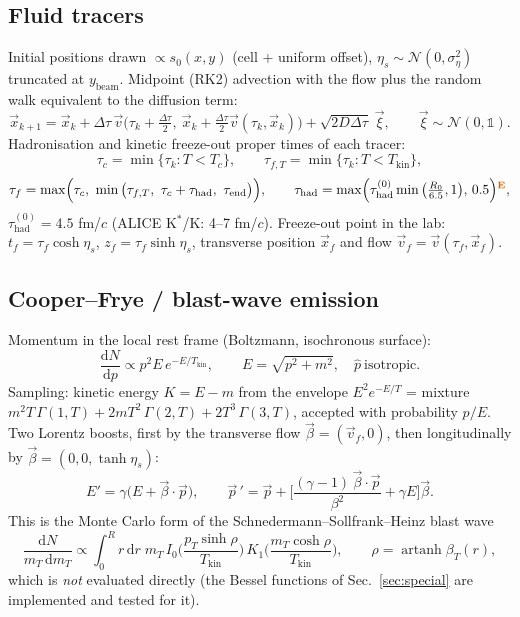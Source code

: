 \documentclass[11pt,a4paper]{article}
\newcommand{\emp}{\textsuperscript{\color{orange!80!black}\textbf{E}}}
\begin{document}
\subsection{Fluid tracers}
Initial positions drawn $\propto s_0(x,y)$ (cell + uniform offset), $\eta_s\sim\mathcal N(0,\sigma_\eta^2)$ truncated at
$y_\text{beam}$. Midpoint (RK2) advection with the flow plus the random walk equivalent to the diffusion term:
\begin{equation}
\vec x_{k+1} = \vec x_k + \Delta\tau\,\vec v\big(\tau_k+\tfrac{\Delta\tau}2,\ \vec x_k+\tfrac{\Delta\tau}2\vec v(\tau_k,\vec x_k)\big)
+ \sqrt{2D\Delta\tau}\;\vec\xi,\qquad \vec\xi\sim\mathcal N(0,\mathbb 1).
\end{equation}
Hadronisation and kinetic freeze-out proper times of each tracer:
\begin{equation}
\tau_c = \min\{\tau_k: T<T_c\},\qquad \tau_{f,T} = \min\{\tau_k: T<T_\text{kin}\},
\end{equation}
\begin{equation}
\tau_f = \max\!\Big(\tau_c,\ \min\big(\tau_{f,T},\ \tau_c+\tau_\text{had},\ \tau_\text{end}\big)\Big),\qquad
\tau_\text{had} = \max\!\Big(\tau_\text{had}^{(0)}\min\big(\tfrac{R_0}{6.5},1\big),\,0.5\Big)\emp,
\end{equation}
$\tau_\text{had}^{(0)} = 4.5$ fm/$c$ (ALICE K$^*$/K: 4--7 fm/$c$). Freeze-out point in the lab:
$t_f = \tau_f\cosh\eta_s$, $z_f = \tau_f\sinh\eta_s$, transverse position $\vec x_f$ and flow $\vec v_f=\vec v(\tau_f,\vec x_f)$.

\subsection{Cooper--Frye / blast-wave emission}
Momentum in the local rest frame (Boltzmann, isochronous surface):
\begin{equation}
\frac{\mathrm dN}{\mathrm dp} \propto p^2E\,e^{-E/T_\text{kin}},\qquad E=\sqrt{p^2+m^2},\quad \hat p\ \text{isotropic}.
\end{equation}
Sampling: kinetic energy $K=E-m$ from the envelope $E^2e^{-E/T}$ = mixture
$m^2T\,\Gamma(1,T) + 2mT^2\,\Gamma(2,T) + 2T^3\,\Gamma(3,T)$, accepted with probability $p/E$.
Two Lorentz boosts, first by the transverse flow $\vec\beta=(\vec v_f,0)$, then longitudinally by
$\vec\beta = (0,0,\tanh\eta_s)$:
\begin{equation}
E' = \gamma\big(E+\vec\beta\!\cdot\!\vec p\big),\qquad
\vec p\,' = \vec p + \Big[\frac{(\gamma-1)\,\vec\beta\!\cdot\!\vec p}{\beta^2} + \gamma E\Big]\vec\beta .
\end{equation}
This is the Monte Carlo form of the Schnedermann--Sollfrank--Heinz blast wave
\begin{equation}
\frac{\mathrm dN}{m_T\,\mathrm dm_T} \propto \int_0^R r\,\mathrm dr\; m_T\,
I_0\!\Big(\frac{p_T\sinh\rho}{T_\text{kin}}\Big)\,K_1\!\Big(\frac{m_T\cosh\rho}{T_\text{kin}}\Big),\qquad
\rho = \operatorname{artanh}\beta_T(r),
\end{equation}
which is \emph{not} evaluated directly (the Bessel functions of Sec.~\ref{sec:special} are implemented and tested for it).
\end{document}
